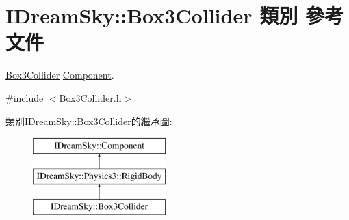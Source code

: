 \hypertarget{class_i_dream_sky_1_1_box3_collider}{}\section{I\+Dream\+Sky\+:\+:Box3\+Collider 類別 參考文件}
\label{class_i_dream_sky_1_1_box3_collider}


\hyperlink{class_i_dream_sky_1_1_box3_collider}{Box3\+Collider} \hyperlink{class_i_dream_sky_1_1_component}{Component}.  




{\ttfamily \#include $<$Box3\+Collider.\+h$>$}

類別\+I\+Dream\+Sky\+:\+:Box3\+Collider的繼承圖\+:\begin{figure}[H]
\begin{center}
\leavevmode
\includegraphics[height=3.000000cm]{class_i_dream_sky_1_1_box3_collider}
\end{center}
\end{figure}
